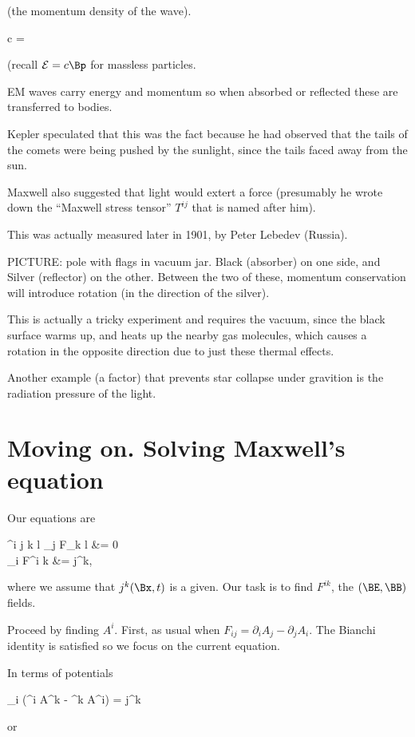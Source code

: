 {{{(the momentum density of the wave).

c  = 

(recall $\mathcal{E} = c\mathcal{\Bp}$ for massless particles.

EM waves carry energy and momentum so when absorbed or reflected these are transferred to bodies.

Kepler speculated that this was the fact because he had observed that the tails of the comets were being pushed by the sunlight, since the tails faced away from the sun.

Maxwell also suggested that light would extert a force (presumably he wrote down the ``Maxwell stress tensor'' $T^{ij}$ that is named after him).

This was actually measured later in 1901, by Peter Lebedev (Russia).

PICTURE: pole with flags in vacuum jar.  Black (absorber) on one side, and Silver (reflector) on the other.  Between the two of these, momentum conservation will introduce rotation (in the direction of the silver).

This is actually a tricky experiment and requires the vacuum, since the black surface warms up, and heats up the nearby gas molecules, which causes a rotation in the opposite direction due to just these thermal effects.

Another example (a factor) that prevents star collapse under gravition is the radiation pressure of the light.

\section{Moving on.  Solving Maxwell's equation}

Our equations are

\epsilon^{i j k l} \partial_j F_{k l} &= 0 \\
\partial_i F^{i k} &=  j^k,

where we assume that $j^k(\Bx, t)$ is a given.  Our task is to find $F^{i k}$, the $(\BE, \BB)$ fields.

Proceed by finding $A^i$.  First, as usual when $F_{i j} = \partial_i A_j - \partial_j A_i$.  The Bianchi identity is satisfied so we focus on the current equation.

In terms of potentials

\partial_i (\partial^i A^k - \partial^k A^i) =  j^k

or

}}}
